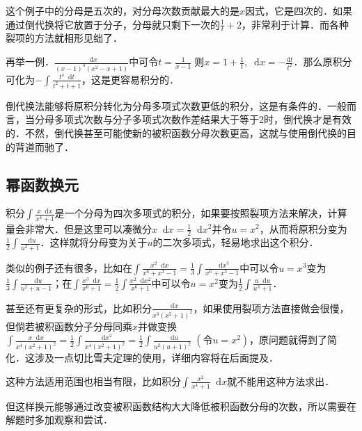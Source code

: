 \documentclass{ctexbook}
\newcommand*{\dif}{\mathop{}\!\mathrm{d}}
\begin{document}
这个例子中的分母是五次的，对分母次数贡献最大的是$x$因式，它是四次的．如果通过倒代换将它放置于分子，分母就只剩下一次的$\frac{1}{t}+2$，非常利于计算．而各种裂项的方法就相形见绌了．\par
再举一例．$\frac{\dif{x}}{\left(x-1\right)^{4}\left(x^{2}-x+1\right)}$中可令$t=\frac{1}{x-1}\;\text{则}x=1+\frac{1}{t},\dif{x}=-\frac{\mathrm{d}t}{t^{2}}$．那么原积分可化为$-\int\frac{t^{4}\dif{t}}{t^{2}+t+1}$，这是更容易积分的．\par
倒代换法能够将原积分转化为分母多项式次数更低的积分，这是有条件的．一般而言，当分母多项式次数与分子多项式次数作差结果大于等于2时，倒代换才是有效的．不然，倒代换甚至可能使新的被积函数分母次数更高，这就与使用倒代换的目的背道而驰了．\par
\subsection{幂函数换元}
积分$\int\frac{x\dif{x}}{x^{4}+1}$是一个分母为四次多项式的积分，如果要按照裂项方法来解决，计算量会非常大．但是这里可以凑微分$x\dif{x}=\frac{1}{2}\dif{x}^{2}$并令$u=x^{2}$，从而将原积分变为$\frac{1}{2}\int\frac{\dif{u}}{u^{2}+1}$．这样就将分母变为关于$u$的二次多项式，轻易地求出这个积分．\par
类似的例子还有很多，比如在$\int\frac{x^{2}\dif{x}}{x^{6}+x^{3}-1}=\frac{1}{3}\int\frac{\dif{x}^{3}}{x^{6}+x^{3}-1}$中可以令$u=x^{3}$变为$\frac{1}{3}\int\frac{\dif{u}}{u^{2}+u-1}$；在$\int\frac{x^{3}\dif{x}}{x^{6}+1}=\frac{1}{2}\int\frac{x^{2}\dif{x}^{2}}{x^{6}+1}$中可以令$u=x^{2}$变为$\frac{1}{2}\int\frac{u\dif{u}}{u^{3}+1}$．\par
甚至还有更复杂的形式，比如积分$\frac{\dif{x}}{x^{3}\left(x^{2}+1\right)^{2}}$，如果使用裂项方法直接做会很慢，但倘若被积函数分子分母同乘$x$并做变换$\int\frac{x\dif{x}}{x^{4}\left(x^{2}+1\right)^{2}}=\frac{1}{2}\int\frac{\dif{x}^{2}}{x^{4}\left(x^{2}+1\right)^{2}}=\frac{1}{2}\int\frac{\dif{u}}{u^{2}\left(u+1\right)^{2}}\;\left(\text{令}u=x^{2}\right)$，原问题就得到了简化．这涉及一点切比雪夫定理的使用，详细内容将在后面提及．\par
这种方法适用范围也相当有限，比如积分$\int\frac{x^{2}}{x^{4}+1}\dif{x}$就不能用这种方法求出．\par
但这样换元能够通过改变被积函数结构大大降低被积函数分母的次数，所以需要在解题时多加观察和尝试．\par
\end{document}
